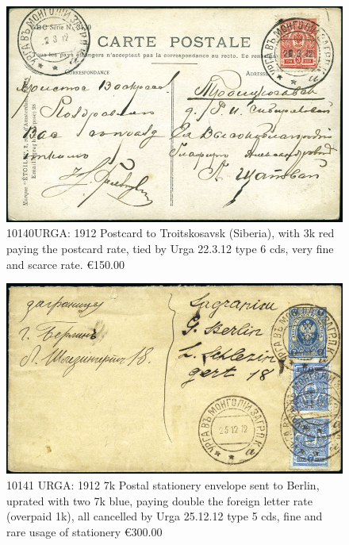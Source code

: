 \begin{figure}[htbp]
\centering
\includegraphics[width=.95\textwidth]{../russian-post-in-mongolia/10140.jpg}
\caption{ 
10140URGA: 1912 Postcard to Troitskosavsk (Siberia), with 3k red paying
the postcard rate, tied by Urga 22.3.12 type 6 cds, very fine and scarce rate.
\euro150.00 
} 
\end{figure}  

\begin{figure}[htbp]
\centering
\includegraphics[width=.95\textwidth]{../russian-post-in-mongolia/10141.jpg}
\caption{ 
10141 URGA: 1912 7k Postal stationery envelope sent to Berlin, 
uprated with two 7k blue, paying double the foreign letter rate 
(overpaid 1k), all cancelled by Urga 25.12.12 type 5 cds, fine 
and rare usage of stationery
\euro 300.00 
} 
\end{figure} 

